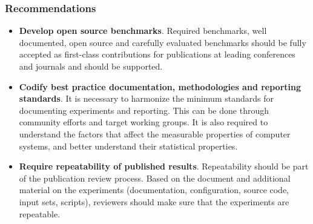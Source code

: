 \documentclass{vldb}
\begin{document}
\subsubsection{Recommendations}
\begin{itemize}
    \item \textbf{Develop open source benchmarks}. Required benchmarks, well documented, open source and carefully evaluated benchmarks should be fully accepted as first-class contributions for publications at leading conferences and journals and should be supported.
    \item \textbf{Codify best practice documentation, methodologies and reporting standards}. It is necessary to harmonize the minimum standards for documenting experiments and reporting. This can be done through community efforts and target working groups. It is also required to understand the factors that affect the measurable properties of computer systems, and better understand their statistical properties.
    \item \textbf{Require repeatability of published results}. Repeatability should be part of the publication review process. Based on the document and additional material on the experiments (documentation, configuration, source code, input sets, scripts), reviewers should make sure that the experiments are repeatable.
\end{itemize}
\end{document}
